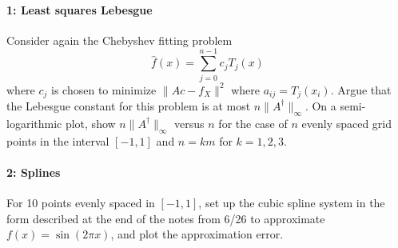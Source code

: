 \documentclass[12pt, leqno]{article} %
\begin{document}

\paragraph*{1: Least squares Lebesgue}
Consider again the Chebyshev fitting problem
\[
  \hat{f}(x) = \sum_{j=0}^{n-1} c_j T_j(x)
\]
where $c_j$ is chosen to minimize $\|Ac-f_X\|^2$ where $a_{ij} = T_j(x_i)$.
Argue that the Lebesgue constant for this problem is at most
$n \|A^\dagger\|_\infty$.  On a semi-logarithmic plot,
show $n \|A^\dagger\|_\infty$ versus $n$ for the case of $n$ evenly
spaced grid points in the interval $[-1,1]$ and $n = km$ for
$k = 1, 2, 3$.

\paragraph*{2: Splines}
For 10 points evenly spaced in $[-1,1]$, set up the cubic spline
system in the form described at the end of the notes from 6/26 to
approximate $f(x) = \sin(2\pi x)$, and plot the approximation error.
\end{document}
